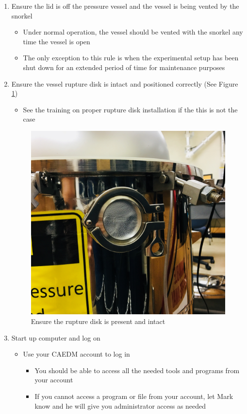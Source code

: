 \documentclass[letterpaper,11pt]{article}
\begin{document}
    \begin{enumerate}
    \item Ensure the lid is off the pressure vessel and the vessel is being 
        vented by the snorkel
        \begin{itemize}
        \item Under normal operation, the vessel should be vented with the 
            snorkel any time the vessel is open
        \item The only exception to this rule is when the experimental setup has
            been shut down for an extended period of time for maintenance 
            purposes
        \end{itemize}
    \item Ensure the vessel rupture disk is intact and positioned correctly 
        (See Figure \ref{fig:rupture_disk})
        \begin{itemize}
        \item See the training on proper rupture disk installation if the this is not the case
        \end{itemize} 
    
\begin{figure}[H]
\centering
\includegraphics[width=.25\textwidth]{rupture_disk.jpg}
\caption{Ensure the rupture disk is present and intact}
\label{fig:rupture_disk}
\end{figure}
    
    \item Start up computer and log on
        \begin{itemize}
      
        \item Use your CAEDM account to log in
            \begin{itemize}
            \item You should be able to access all the needed tools and 
                programs from your account
            \item If you cannot access a program or file from your account, let 
                Mark know and he will give you administrator access as needed
            \end{itemize}
        

\end{itemize}
\end{enumerate}
\end{document}

